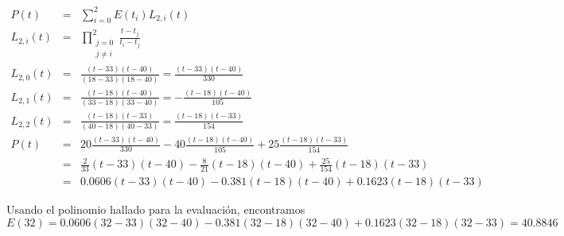 \documentclass[12pt]{article}
\begin{document}
\begin{enumerate}[leftmargin=*,widest=9]
    \begin{eqnarray*}
    P(t) & = & \sum_{i=0}^2 E(t_i) L_{2, i}(t) \\
    L_{2, i}(t) & = & \prod_{\substack{j=0 \\ j \neq i}}^{2} \frac{t-t_j}{t_i - t_j}\\
    L_{2, 0}(t) & = & \frac{(t-33)(t-40)}{(18-33)(18-40)} = \frac{(t-33)(t-40)}{330}\\
    L_{2, 1}(t) & = & \frac{(t-18)(t-40)}{(33-18)(33-40)} = -\frac{(t-18)(t-40)}{105}\\
    L_{2, 2}(t) & = & \frac{(t-18)(t-33)}{(40-18)(40-33)} = \frac{(t-18)(t-33)}{154}\\
    P(t) & = & 20 \frac{(t-33)(t-40)}{330} - 40 \frac{(t-18)(t-40)}{105} + 25 \frac{(t-18)(t-33)}{154}\\
    & = & \frac{2}{33}(t-33)(t-40) - \frac{8}{21}(t-18)(t-40) +  \frac{25}{154}(t-18)(t-33)\\
    & = & 0.0606(t-33)(t-40) - 0.381(t-18)(t-40) +  0.1623(t-18)(t-33)
    \end{eqnarray*}
    
    Usando el polinomio hallado para la evaluación, encontramos
    \[ E(32) = 0.0606(32-33)(32-40) - 0.381(32-18)(32-40) +  0.1623(32-18)(32-33) = 40.8846 \]

  \end{enumerate}
  
\end{document}
